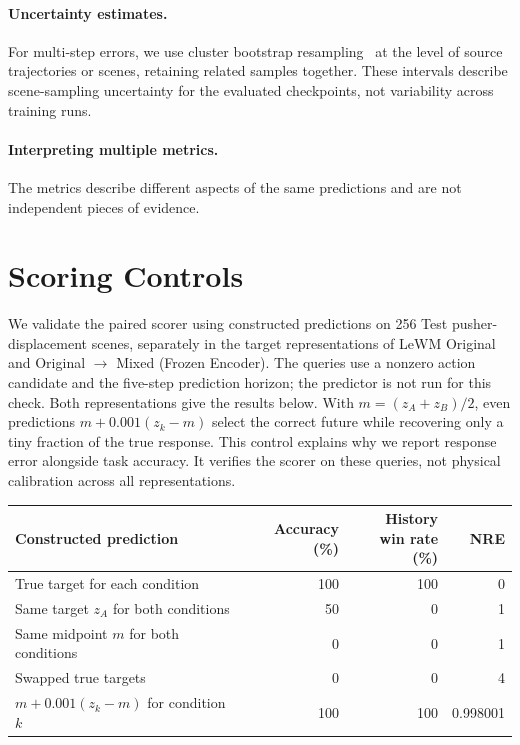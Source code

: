 \paragraph{Uncertainty estimates.}
\label{app:result-uncertainty}
For multi-step errors, we use cluster bootstrap resampling~\cite{efron1993bootstrap,field2007cluster} at the level of source trajectories or scenes, retaining related samples together.
These intervals describe scene-sampling uncertainty for the evaluated checkpoints, not variability across training runs.

\paragraph{Interpreting multiple metrics.}
The metrics describe different aspects of the same predictions and are not independent pieces of evidence.

\clearpage
\onecolumn
\section{Scoring Controls}
\label{app:scoring-controls}

We validate the paired scorer using constructed predictions on 256 Test pusher-displacement scenes, separately in the target representations of LeWM Original and Original $\rightarrow$ Mixed (Frozen Encoder).
The queries use a nonzero action candidate and the five-step prediction horizon; the predictor is not run for this check.
Both representations give the results below.
With $m=(z_A+z_B)/2$, even predictions $m+0.001(z_k-m)$ select the correct future while recovering only a tiny fraction of the true response.
This control explains why we report response error alongside task accuracy.
It verifies the scorer on these queries, not physical calibration across all representations.

\begin{center}\small
\begin{tabular}{@{}lrrr@{}}
\toprule
Constructed prediction & Accuracy (\%) & \shortstack{History\\win rate (\%)} & NRE\\
\midrule
True target for each condition & 100 & 100 & 0\\
Same target $z_A$ for both conditions & 50 & 0 & 1\\
Same midpoint $m$ for both conditions & 0 & 0 & 1\\
Swapped true targets & 0 & 0 & 4\\
$m+0.001(z_k-m)$ for condition $k$ & 100 & 100 & 0.998001\\
\bottomrule\end{tabular}\end{center}

